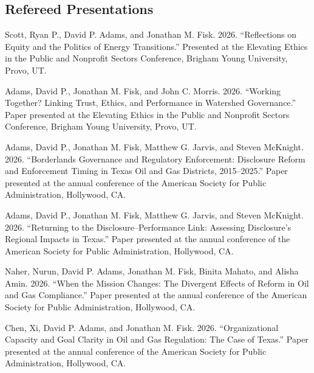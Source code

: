 \documentclass[11pt,letterpaper]{article}
\renewenvironment{itemize}{
  \begin{list}{}{
    \setlength{\leftmargin}{1.5em}
    \setlength{\itemsep}{0.25em}
    \setlength{\parskip}{0pt}
    \setlength{\parsep}{0.25em}
  }
}{
  \end{list}
}
\begin{document}
\subsection*{Refereed Presentations}
	\begin{itemize}\leftmargin=2pt\itemindent=-15pt\leftmargin=2pt\itemindent=-15pt
    
    \item Scott, Ryan P., David P. Adams, and Jonathan M. Fisk. 2026. ``Reflections on Equity and the Politics of Energy Transitions.'' Presented at the Elevating Ethics in the Public and Nonprofit Sectors Conference, Brigham Young University, Provo, UT.

    \item Adams, David P., Jonathan M. Fisk, and John C. Morris. 2026. ``Working Together? Linking Trust, Ethics, and Performance in Watershed Governance.'' Paper presented at the Elevating Ethics in the Public and Nonprofit Sectors Conference, Brigham Young University, Provo, UT.

    \item Adams, David P., Jonathan M. Fisk, Matthew G. Jarvis, and Steven McKnight. 2026. ``Borderlands Governance and Regulatory Enforcement: Disclosure Reform and Enforcement Timing in Texas Oil and Gas Districts, 2015--2025.'' Paper presented at the annual conference of the American Society for Public Administration, Hollywood, CA.

    \item Adams, David P., Jonathan M. Fisk, Matthew G. Jarvis, and Steven McKnight. 2026. ``Returning to the Disclosure--Performance Link: Assessing Disclosure's Regional Impacts in Texas.'' Paper presented at the annual conference of the American Society for Public Administration, Hollywood, CA.

    \item Naher, Nurun, David P. Adams, Jonathan M. Fisk, Binita Mahato, and Alisha Amin. 2026. ``When the Mission Changes: The Divergent Effects of Reform in Oil and Gas Compliance.'' Paper presented at the annual conference of the American Society for Public Administration, Hollywood, CA.

    \item Chen, Xi, David P. Adams, and Jonathan M. Fisk. 2026. ``Organizational Capacity and Goal Clarity in Oil and Gas Regulation: The Case of Texas.'' Paper presented at the annual conference of the American Society for Public Administration, Hollywood, CA.


\end{itemize}
\end{document}
